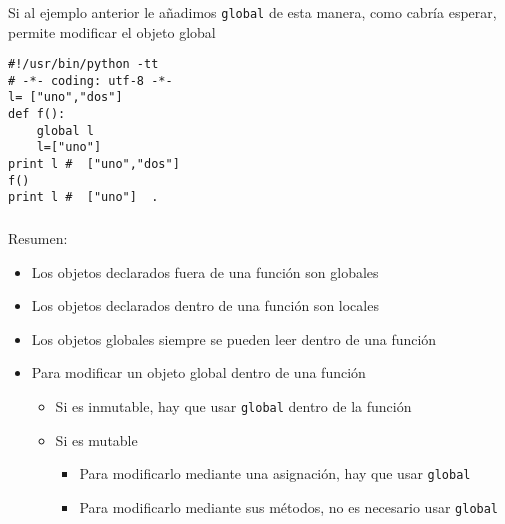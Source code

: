 \documentclass[ucs]{beamer}
\begin{document}
\begin{frame}[fragile]
\frametitle{}
Si al ejemplo anterior le añadimos \verb|global| de esta manera,
como cabría esperar, permite modificar el objeto global



  \begin{footnotesize}
  \begin{verbatim}
#!/usr/bin/python -tt
# -*- coding: utf-8 -*-
l= ["uno","dos"]
def f():
    global l
    l=["uno"]
print l #  ["uno","dos"]
f()
print l #  ["uno"]  . 
  \end{verbatim}
  \end{footnotesize}
\end{frame}


\begin{frame}[fragile]
\frametitle{}
Resumen:
\begin{itemize}
\item
Los objetos declarados fuera de una función son globales
\item
Los objetos declarados dentro de una función son locales
\item
Los objetos globales siempre se pueden leer dentro de una función
\item
Para modificar un objeto global dentro de una función
\begin{itemize}
\item
Si es inmutable, hay que usar \verb|global| dentro de la función

\item
Si es mutable

\begin{itemize}
\item
Para modificarlo mediante una asignación, hay que usar \verb|global|
\item
Para modificarlo mediante sus métodos, no es necesario usar \verb|global|
\end{itemize}
\end{itemize}


\end{itemize}

\end{frame}
\end{document}
